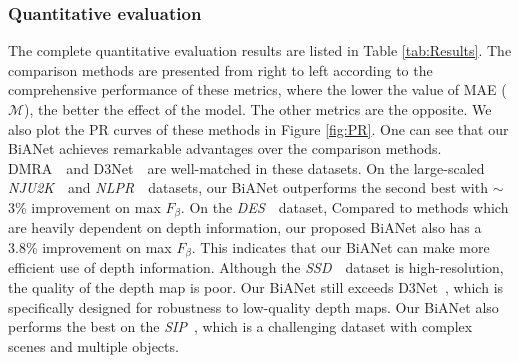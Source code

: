 \documentclass[journal]{IEEEtran}
\newcommand{\tabref}[1]{Table \ref{#1}}
\newcommand{\figref}[1]{Figure \ref{#1}}
\newcommand{\DMRA}{DMRA~\cite{piao2019depth}}
\newcommand{\DTNet}{D3Net~\cite{fan2019D3Net}}
\newcommand{\NJU}{\textit{NJU2K}~\cite{ju2014depth}}
\newcommand{\NLPR}{\textit{NLPR}~\cite{peng2014rgbd}}
\newcommand{\DES}{\textit{DES}~\cite{cheng2014depth}}
\newcommand{\SSD}{\textit{SSD}~\cite{zhu2017three}}
\newcommand{\SIP}{\textit{SIP}~\cite{fan2019D3Net}}
\begin{document}
\subsubsection{Quantitative evaluation}
The complete quantitative evaluation results are listed in \tabref{tab:Results}.
The comparison methods are presented from right to left according to the comprehensive performance of these metrics,
where the lower the value of MAE ($\mathcal{M}$), the better the effect of the model.
The other metrics are the opposite.
We also plot the PR curves of these methods in \figref{fig:PR}.
One can see that our BiANet achieves remarkable advantages over the comparison methods.
\DMRA~and \DTNet~are well-matched in these datasets.
On the large-scaled \NJU~and \NLPR~datasets, our BiANet outperforms the second best with $\sim$3\% improvement on max $F_{\beta}$.
On the \DES~dataset, Compared to methods which are heavily dependent on depth information,
our proposed BiANet also has a 3.8\% improvement on max $F_{\beta}$.
This indicates that our BiANet can make more efficient use of depth information.
Although the \SSD~dataset is high-resolution, the quality of the depth map is poor.
Our BiANet still exceeds \DTNet, which is specifically designed for robustness to low-quality depth maps.
Our BiANet also performs the best on the \SIP, which is a challenging dataset with complex scenes and multiple objects.
\end{document}

